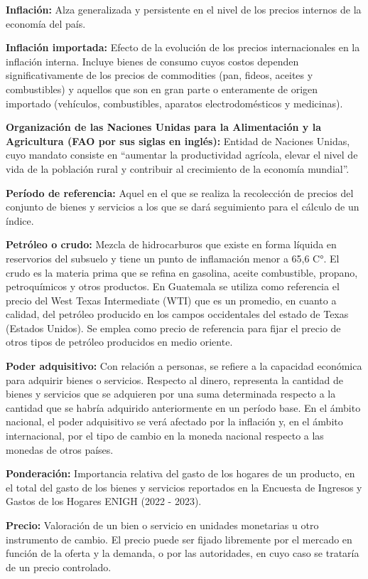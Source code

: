 {\textbf{Inflación:} Alza generalizada y persistente en el nivel de los precios internos de la economía del país.

\textbf{Inflación importada:} Efecto de la evolución de los precios internacionales en la inflación interna. Incluye bienes de consumo cuyos costos dependen significativamente de los precios de commodities (pan, fideos, aceites y combustibles) y aquellos que son en gran parte o enteramente de origen importado (vehículos, combustibles, aparatos electrodomésticos y medicinas).

\textbf{Organización de las Naciones Unidas para la Alimentación y la Agricultura (FAO por sus siglas en inglés):} Entidad de Naciones Unidas, cuyo mandato consiste en “aumentar la productividad agrícola, elevar el nivel de vida de la población rural y contribuir al crecimiento de la economía mundial”.

\textbf{Período de referencia:} Aquel en el que se realiza la recolección de precios del conjunto de bienes y servicios a los que se dará seguimiento para el cálculo de un índice.

\textbf{Petróleo o crudo:} Mezcla de hidrocarburos que existe en forma líquida en reservorios del subsuelo y tiene un punto de inflamación menor a 65,6 C°. El crudo es la materia prima que se refina en gasolina, aceite combustible, propano, petroquímicos y otros productos. En Guatemala se utiliza como referencia el precio del West Texas Intermediate (WTI) que es un promedio, en cuanto a calidad, del petróleo producido en los campos occidentales del estado de Texas (Estados Unidos). Se emplea como precio de referencia para fijar el precio de otros tipos de petróleo producidos en medio oriente.

\textbf{Poder adquisitivo:} Con relación a personas, se refiere a la capacidad económica para adquirir bienes o servicios. Respecto al dinero, representa la cantidad de bienes y servicios que se adquieren por una suma determinada respecto a la cantidad que se habría adquirido anteriormente en un período base. En el ámbito nacional, el poder adquisitivo se verá afectado por la inflación y, en el ámbito internacional, por el tipo de cambio en la moneda nacional respecto a las monedas de otros países.

\textbf{Ponderación:} Importancia relativa del gasto de los hogares de un producto, en el total del gasto de los bienes y servicios reportados en la Encuesta de Ingresos y Gastos de los Hogares ENIGH (2022 - 2023).

\textbf{Precio:} Valoración de un bien o servicio en unidades monetarias u otro instrumento de cambio. El precio puede ser fijado libremente por el mercado en función de la oferta y la demanda, o por las autoridades, en cuyo caso se trataría de un precio controlado.

}
